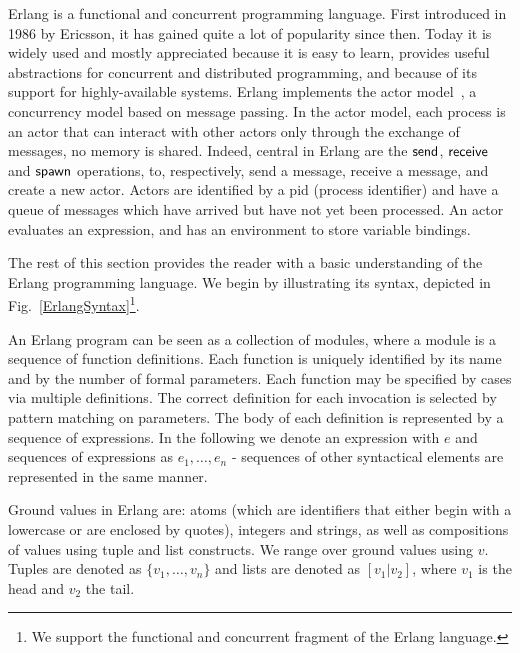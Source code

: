 \documentclass{article}[12pt,a4paper]
\theoremstyle{definition}
\begin{document}
Erlang is a functional and concurrent programming language. First
introduced in 1986 by Ericsson, it has gained quite a lot of
popularity since then.  Today it is widely used and mostly appreciated
because it is easy to learn, provides useful abstractions for
concurrent and distributed programming, and because of its support for
highly-available systems. Erlang implements the actor model~\cite{Hewitt73}, a
concurrency model based on message passing. In the actor model, each
process is an actor that can interact with other actors
only through the exchange of messages, no memory is shared. Indeed,
central in Erlang are the $\mathsf{send}$, $\mathsf{receive}$ and $\mathsf{spawn}$
operations, to, respectively, send a message, receive a message, and
create a new actor. Actors are identified by a pid (process identifier) and have a queue of messages which have arrived but have not yet been processed.
An actor evaluates an expression, and has an environment to store variable bindings.

The rest of this section provides the reader with a basic understanding
of the Erlang programming language. We begin by illustrating its syntax, depicted in
Fig.~\ref{ErlangSyntax}\footnote{We support the functional and concurrent fragment of the
  Erlang language.}. 

An Erlang program can be seen as a collection of modules, where a module is a sequence of function definitions. Each function is uniquely identified by its name and by the
number of formal parameters. Each function may be specified by cases via multiple definitions. The correct definition for each invocation is selected by pattern matching on parameters. The body of each definition is represented
by a sequence of expressions. In the following we denote an expression with $e$
and sequences of expressions as $e_1,\ldots,e_n$  - sequences of other
syntactical elements are represented in the same manner.  

Ground values in Erlang are: atoms (which are identifiers that either
begin with a lowercase or are enclosed by quotes), integers and
strings, as well as compositions of values using tuple and list
constructs. We range over ground values using $v$. Tuples are denoted
as $\{v_1,\ldots,v_n\}$ and lists are denoted as
$[v_1|v_2]$, where $v_1$ is the head and $v_2$ the tail.
\end{document}
